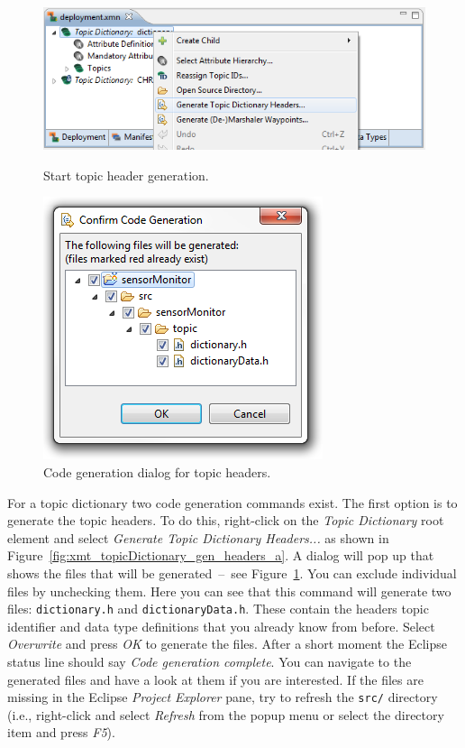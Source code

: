 \begin{figure}[htpb]
	\begin{minipage}[b]{0.45\linewidth}
		\centering
		\includegraphics[scale=0.5]{figures/xmt_topicDictionary_gen_headers_a.png}
		\caption{Start topic header generation.}
		\label{fig:xmt_topicDictionary_gen_headers_a}
	\end{minipage}
	\hspace{0.5cm}
	\begin{minipage}[b]{0.45\linewidth}
		\centering
		\includegraphics[scale=0.5]{figures/xmt_topicDictionary_gen_headers_b.png}
		\caption{Code generation dialog for topic headers.}
		\label{fig:xmt_topicDictionary_gen_headers_b}
	\end{minipage}
\end{figure}

For a topic dictionary two code generation commands exist.
The first option is to generate the topic headers.
To do this, right-click on the \emph{Topic Dictionary} root element and select \emph{Generate Topic Dictionary Headers...} as shown in Figure~\ref{fig:xmt_topicDictionary_gen_headers_a}.
A dialog will pop up that shows the files that will be generated~--~see Figure~\ref{fig:xmt_topicDictionary_gen_headers_b}.
You can exclude individual files by unchecking them.
Here you can see that this command will generate two files: \texttt{dictionary.h} and \texttt{dictionaryData.h}.
These contain the headers topic identifier and data type definitions that you already know from before.
Select \emph{Overwrite} and press \emph{OK} to generate the files.
After a short moment the Eclipse status line should say \emph{Code generation complete}.
You can navigate to the generated files and have a look at them if you are interested.
If the files are missing in the Eclipse \emph{Project Explorer} pane, try to refresh the \verb|src/| directory
(i.e., right-click and select \emph{Refresh} from the popup menu or select the directory item and press \emph{F5}).

